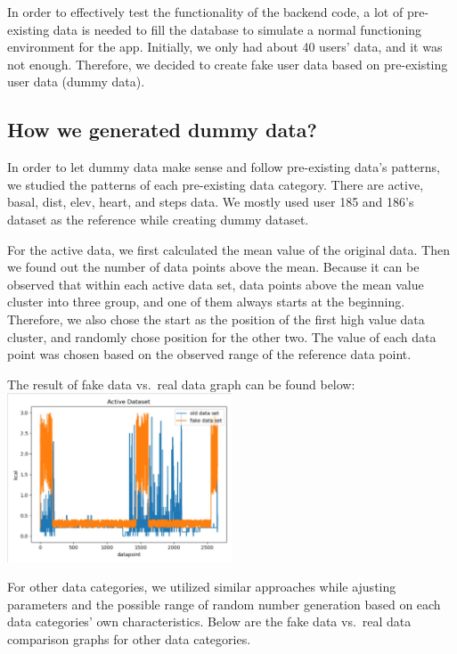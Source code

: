 \documentclass[]{book}
\begin{document}
In order to effectively test the functionality of the backend code, a
lot of pre-existing data is needed to fill the database to simulate a
normal functioning environment for the app. Initially, we only had about
40 users' data, and it was not enough. Therefore, we decided to create
fake user data based on pre-existing user data (dummy data).

\subsection{How we generated dummy
data?}\label{how-we-generated-dummy-data}

In order to let dummy data make sense and follow pre-existing data's
patterns, we studied the patterns of each pre-existing data category.
There are active, basal, dist, elev, heart, and steps data. We mostly
used user 185 and 186's dataset as the reference while creating dummy
dataset.

For the active data, we first calculated the mean value of the original
data. Then we found out the number of data points above the mean.
Because it can be observed that within each active data set, data points
above the mean value cluster into three group, and one of them always
starts at the beginning. Therefore, we also chose the start as the
position of the first high value data cluster, and randomly chose
position for the other two. The value of each data point was chosen
based on the observed range of the reference data point.

The result of fake data vs.~real data graph can be found below:\\
\includegraphics[width=0.50000\textwidth]{./images/Active Data.JPG}

For other data categories, we utilized similar approaches while ajusting
parameters and the possible range of random number generation based on
each data categories' own characteristics. Below are the fake data
vs.~real data comparison graphs for other data categories.
\end{document}
